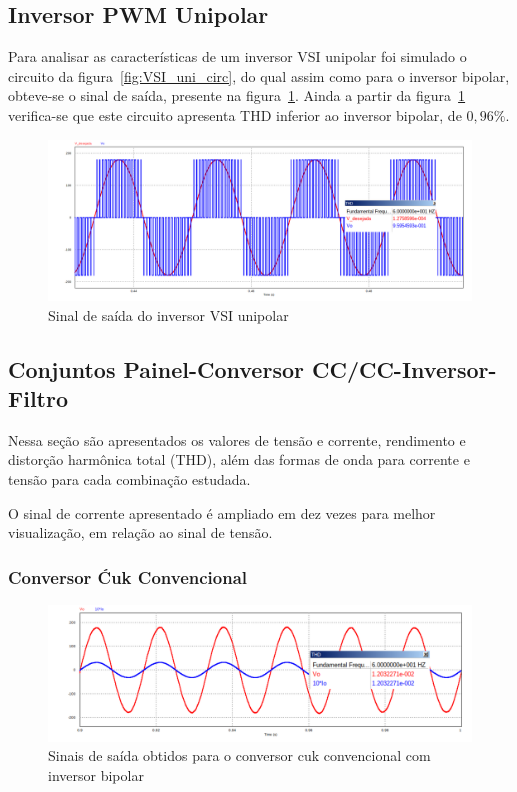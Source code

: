 \documentclass[
	12pt,				%
	openright,			%
	onseside,
	a4paper,			%
	english,			%
	french,				%
	spanish,			%
	brazil,				%
	]{abntex2}
\begin{document}
\subsection{Inversor PWM Unipolar}

Para analisar as características de um inversor VSI unipolar foi simulado o circuito da figura~\ref{fig:VSI_uni_circ}, do qual assim como para o inversor bipolar, obteve-se o sinal de saída, presente na figura~\ref{fig:response_vsi_uni}. Ainda a partir da figura~\ref{fig:response_vsi_uni} verifica-se que este circuito apresenta THD inferior ao inversor bipolar, de $0,96\%$.

\begin{figure}[H]%
	\centering
		\includegraphics[width=0.8 \linewidth]{vsi_uni_out}
		\caption{Sinal de saída do inversor VSI unipolar}
		\label{fig:response_vsi_uni}
\end{figure}

\subsection{Conjuntos Painel-Conversor CC/CC-Inversor-Filtro}

Nessa seção são apresentados os valores de tensão e corrente, rendimento e distorção harmônica total (THD), além das formas de onda para corrente e tensão para cada combinação estudada.

O sinal de corrente apresentado é ampliado em dez vezes para melhor visualização, em relação ao sinal de tensão.

\subsubsection{Conversor Ćuk Convencional}

\begin{figure}[H]%
	\captionsetup{justification=centering}
	\centering
		\includegraphics[width=0.7 \linewidth]{conv_Vo_10Io_comp}
		\caption{Sinais de saída obtidos para o conversor cuk convencional com inversor bipolar}
		\label{fig:out_conv_bip}
\end{figure}
\end{document}
